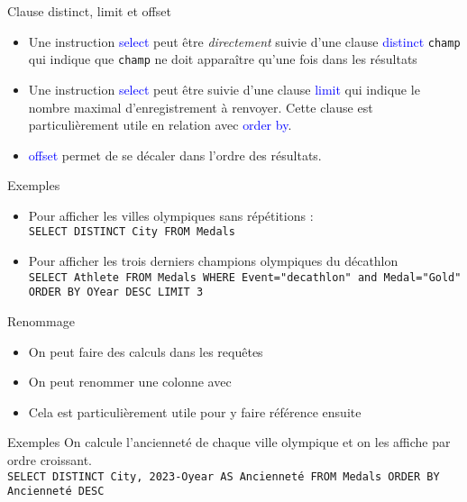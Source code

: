 \documentclass[10pt]{beamer}
\begin{document}
\begin{frame}{\Ctitle}{\stitle}
	\begin{alertblock}{Clause {\sc distinct}, {\sc limit} et {\sc offset}}
		\begin{itemize}
			\item<2-> Une instruction \textcolor{blue}{\sc select} peut être \textit{directement} suivie d'une clause \textcolor{blue}{\sc distinct} {\tt champ} qui indique que {\tt champ} ne doit apparaître qu'une fois dans les résultats
			\item<3-> Une instruction \textcolor{blue}{\sc select} peut être suivie d'une clause \textcolor{blue}{\sc limit} qui indique le nombre maximal d'enregistrement à renvoyer. Cette clause est particulièrement utile en relation avec \textcolor{blue}{\sc order by}.
			\item<4-> \textcolor{blue}{\sc offset} permet de se décaler dans l'ordre des résultats.
		\end{itemize}
	\end{alertblock}
	\begin{exampleblock}{Exemples}
		\begin{itemize}
			\item<5-> Pour afficher les villes olympiques  sans répétitions :\\
				\onslide<6->\texttt{SELECT DISTINCT City FROM Medals}
			\item<7-> Pour afficher les trois derniers champions olympiques du décathlon\\
				\onslide<8->\texttt{SELECT Athlete FROM Medals WHERE Event="decathlon" and Medal="Gold" ORDER BY OYear DESC LIMIT 3}
		\end{itemize}
	\end{exampleblock}
\end{frame}


\begin{frame}{\Ctitle}{\stitle}
	\begin{alertblock}{Renommage}
		\begin{itemize}
			\item<1-> On peut faire des calculs dans les requêtes
			\item<2-> On peut renommer une colonne avec 
			\item<3-> Cela est particulièrement utile pour y faire référence ensuite
		\end{itemize}
	\end{alertblock}
	\begin{exampleblock}{Exemples}
		\onslide<4-> On calcule l'ancienneté de chaque ville olympique et on les affiche par ordre croissant.\\
		\onslide<5->\texttt{SELECT DISTINCT City, 2023-Oyear AS Ancienneté FROM Medals ORDER BY Ancienneté DESC}
	\end{exampleblock}
\end{frame}
\end{document}
